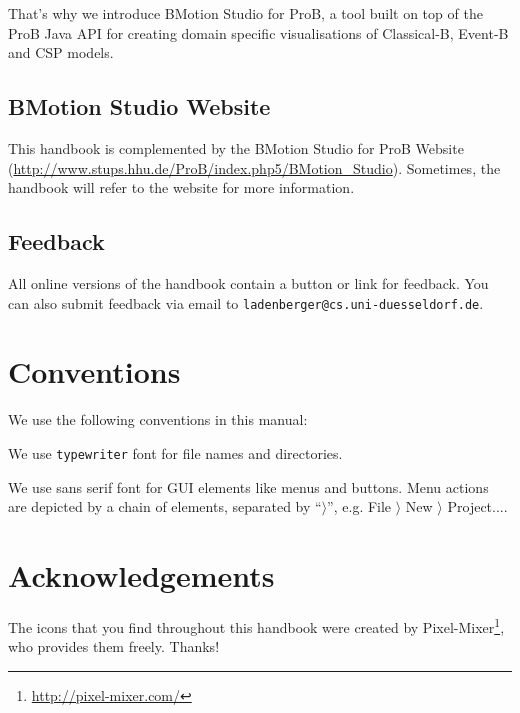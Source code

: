 \documentclass[twoside,10pt]{book}
\begin{document}
That's why we introduce BMotion Studio for ProB, a tool built on top of the ProB Java API for creating domain specific visualisations of Classical-B, Event-B and CSP models.

\subsection{BMotion Studio Website}
\label{rodin_wiki}

This handbook is complemented by the BMotion Studio for ProB Website (\url{http://www.stups.hhu.de/ProB/index.php5/BMotion_Studio}).  Sometimes, the handbook will refer to the website for more information.

\subsection{Feedback}
\label{feedback}

All online versions of the handbook contain a button or link for feedback.  You can also submit feedback via email to \texttt{ladenberger@cs.uni-duesseldorf.de}.

\section{Conventions}
\label{conventions}

We use the following conventions in this manual:


We use \texttt{typewriter} font for file names and directories.

We use \textsf{sans serif font} for GUI elements like menus and buttons.  Menu actions are depicted by a chain of elements, separated by ``$\rangle$'', e.g. \textsf{File $\rangle$ New $\rangle$ Project...}.

\section{Acknowledgements}
\label{sec:acknowledgements}

The icons that you find throughout this handbook were created by Pixel-Mixer\footnote{\url{http://pixel-mixer.com/}}, who provides them freely.  Thanks!
\end{document}
